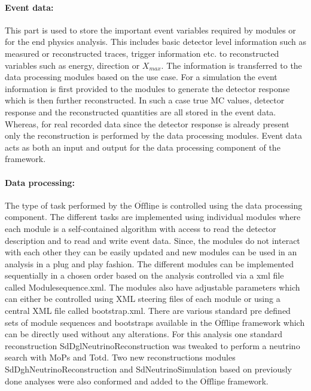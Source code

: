 \paragraph*{Event data:}
This part is used to store the important event variables required by modules or for the end physics analysis. This includes basic detector level information such as measured or reconstructed traces, trigger information etc. to reconstructed variables such as energy, direction or $X_{max}$. The information is transferred to the data processing modules based on the use case. For a simulation the event information is first provided to the modules to generate the detector response which is then further reconstructed. In such a case true MC values, detector response and the reconstructed quantities are all stored in the event data. Whereas, for real recorded data since the detector response is already present only the reconstruction is performed by the data processing modules. Event data acts as both an input and output for the data processing component of the framework.

\paragraph*{Data processing:}
The type of task performed by the $\mathrm{\overline{Off}\underline{line}}$ is controlled using the data processing component. The different tasks are implemented using individual modules where each module is a self-contained algorithm with access to read the detector description and to read and write event data. Since, the modules do not interact with each other they can be easily updated and new modules can be used in an analysis in a plug and play fashion. The different modules can be implemented sequentially in a chosen order based on the analysis controlled via a xml file called Modulesequence.xml. The modules also have adjustable parameters which can either be controlled using XML steering files of each module or using a central XML file called bootstrap.xml. There are various standard pre defined sets of module sequences and bootstraps available in the $\mathrm{\overline{Off}\underline{line}}$ framework which can be directly used without any alterations. For this analysis one standard reconstruction SdDglNeutrinoReconstruction was tweaked to perform a neutrino search with MoPs and Totd. Two new reconstructions modules SdDghNeutrinoReconstruction and SdNeutrinoSimulation based on previously done analyses were also conformed and added to the $\mathrm{\overline{Off}\underline{line}}$ framework. 

